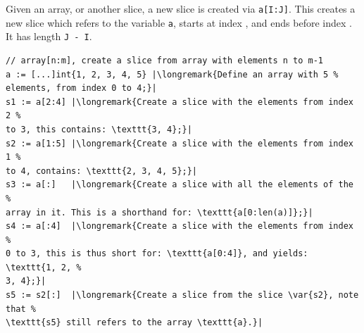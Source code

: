 Given an array, or another slice, a new slice is created via
\lstinline{a[I:J]}. This creates a new slice which refers to 
the variable \lstinline{a}, starts at index , and ends
before index . It has length \lstinline{J - I}.

\begin{lstlisting}
// array[n:m], create a slice from array with elements n to m-1
a := [...]int{1, 2, 3, 4, 5} |\longremark{Define an array with 5 %
elements, from index 0 to 4;}|
s1 := a[2:4] |\longremark{Create a slice with the elements from index 2 %
to 3, this contains: \texttt{3, 4};}|
s2 := a[1:5] |\longremark{Create a slice with the elements from index 1 %
to 4, contains: \texttt{2, 3, 4, 5};}|
s3 := a[:]   |\longremark{Create a slice with all the elements of the %
array in it. This is a shorthand for: \texttt{a[0:len(a)]};}|
s4 := a[:4]  |\longremark{Create a slice with the elements from index %
0 to 3, this is thus short for: \texttt{a[0:4]}, and yields: \texttt{1, 2, %
3, 4};}|
s5 := s2[:]  |\longremark{Create a slice from the slice \var{s2}, note that %
\texttt{s5} still refers to the array \texttt{a}.}|
\end{lstlisting}
\showremarks


